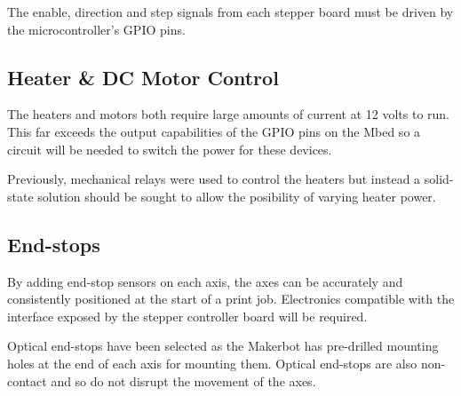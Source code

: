 			The enable, direction and step signals from each stepper board must be
			driven by the microcontroller's GPIO pins.
		
		\subsection{Heater \& DC Motor Control}
			
			The heaters and motors both require large amounts of current at 12 volts
			to run. This far exceeds the output capabilities of the GPIO pins on the
			Mbed so a circuit will be needed to switch the power for these devices.
			
			Previously, mechanical relays were used to control the heaters but instead
			a solid-state solution should be sought to allow the posibility of varying
			heater power.
		
		\subsection{End-stops}
			
			By adding end-stop sensors on each axis, the axes can be accurately and
			consistently positioned at the start of a print job. Electronics
			compatible with the interface exposed by the stepper controller board will
			be required.
			
			Optical end-stops have been selected as the Makerbot has pre-drilled
			mounting holes at the end of each axis for mounting them.  Optical
			end-stops are also non-contact and so do not disrupt the movement of the
			axes.
